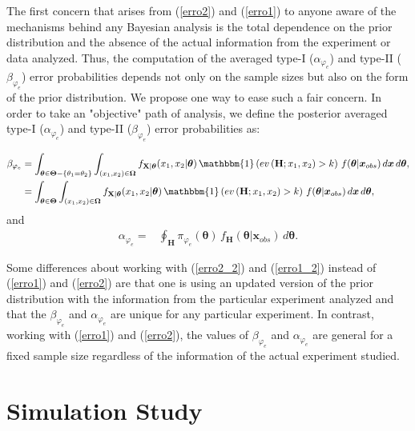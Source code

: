 \documentclass[AMA,Times1COL]{WileyNJDv5} %
\newcommand{\bX}{\boldsymbol{\mathrm{X}}}
\begin{document}
The first concern that arises from (\ref{erro2}) and (\ref{erro1}) to anyone aware of the mechanisms behind any Bayesian analysis is the total
dependence on the prior distribution and the absence of the actual information from the experiment or data analyzed. Thus, the
computation of the averaged type-I ($\alpha_{\varphi_{e}}$) and type-II ($\beta_{\varphi_{e}}$) error probabilities depends not only on the sample sizes but also on the form
of the prior distribution. We propose one way to ease such a fair concern. In order to take an "objective" path of analysis, we define the posterior averaged type-I ($\alpha_{\varphi_{e}}$) and type-II ($\beta_{\varphi_{e}}$) error probabilities as:
\newpage

\begin{align}\label{erro2_2}
\beta_{\varphi_{e}} &= \int_{ \boldsymbol{\theta} \in \boldsymbol{\Theta} - \{\theta_1=\theta_2\}}\int_{(x_{1}, x_{2}) \in \boldsymbol{\Omega}} f_{{\bX \vert \boldsymbol{\theta}}}(x_{1}, x_{2}\vert \boldsymbol{\theta}) \, \mathbbm{1} \left(ev\left(\text{\textbf{H}};x_{1}, x_{2} \right)> 
k\right) \, f(\boldsymbol{\theta}|\boldsymbol{x}_{obs}) \, d\boldsymbol{x} \,d\boldsymbol{\theta},\nonumber\\
& = \int_{ \boldsymbol{\theta} \in \boldsymbol{\Theta} }\int_{(x_{1}, x_{2}) \in \boldsymbol{\Omega}} f_{{\bX \vert \boldsymbol{\theta}}}(x_{1}, x_{2}\vert \boldsymbol{\theta}) \, \mathbbm{1} \left(ev\left(\text{\textbf{H}};x_{1}, x_{2} \right)> 
k\right) \, f(\boldsymbol{\theta}|\boldsymbol{x}_{obs}) \, d\boldsymbol{x} \,d\boldsymbol{\theta},
\end{align}
and
\begin{align}\label{erro1_2}
\alpha_{\varphi_{e}} = &\oint_{\textbf{H}} \pi_{\varphi_{e}}(\boldsymbol{\theta}) \,f_{\textbf{H}}(\boldsymbol{\theta}|\boldsymbol{x}_{obs}) \,d\boldsymbol{\theta}. 
\end{align}

Some differences about working with (\ref{erro2_2}) and (\ref{erro1_2}) instead of (\ref{erro1}) and (\ref{erro2}) are that one is using an updated version of the prior distribution with the information from the particular experiment analyzed and that the $\beta_{\varphi_{e}}$ and $\alpha_{\varphi_{e}}$ are unique for any particular experiment. In contrast, working with (\ref{erro1}) and (\ref{erro2}), the values of $\beta_{\varphi_{e}}$ and $\alpha_{\varphi_{e}}$ are general for a fixed sample size regardless of the information of the actual experiment studied.


\section{Simulation Study}\label{sec1}
\end{document}
